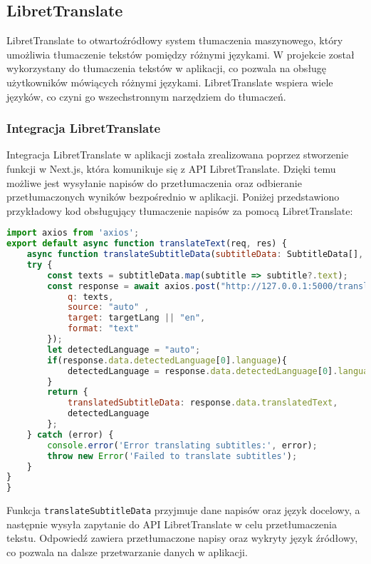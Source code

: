 \subsection{LibretTranslate}
LibretTranslate to otwartoźródłowy system tłumaczenia maszynowego, który umożliwia tłumaczenie tekstów pomiędzy różnymi językami. W projekcie został wykorzystany do tłumaczenia tekstów w aplikacji, co pozwala na obsługę użytkowników mówiących różnymi językami. LibretTranslate wspiera wiele języków, co czyni go wszechstronnym narzędziem do tłumaczeń.

\subsubsection{Integracja LibretTranslate}
Integracja LibretTranslate w aplikacji została zrealizowana poprzez stworzenie funkcji w Next.js, która komunikuje się z API LibretTranslate. Dzięki temu możliwe jest wysyłanie napisów do przetłumaczenia oraz odbieranie przetłumaczonych wyników bezpośrednio w aplikacji. Poniżej przedstawiono przykładowy kod obsługujący tłumaczenie napisów za pomocą LibretTranslate:

\begin{lstlisting}[language=JavaScript, caption=Przykładowy kod integracji LibretTranslate w Next.js]
import axios from 'axios';
export default async function translateText(req, res) {
    async function translateSubtitleData(subtitleData: SubtitleData[], targetLang: string) {
    try {
        const texts = subtitleData.map(subtitle => subtitle?.text);
        const response = await axios.post("http://127.0.0.1:5000/translate", {
            q: texts,
            source: "auto" ,
            target: targetLang || "en",
            format: "text"
        });
        let detectedLanguage = "auto";
        if(response.data.detectedLanguage[0].language){
            detectedLanguage = response.data.detectedLanguage[0].language;
        }
        return {
            translatedSubtitleData: response.data.translatedText,
            detectedLanguage
        };
    } catch (error) {
        console.error('Error translating subtitles:', error);
        throw new Error('Failed to translate subtitles');
    }
}
}
\end{lstlisting}

Funkcja \texttt{translateSubtitleData} przyjmuje dane napisów oraz język docelowy, a następnie wysyła zapytanie do API LibretTranslate w celu przetłumaczenia tekstu. Odpowiedź zawiera przetłumaczone napisy oraz wykryty język źródłowy, co pozwala na dalsze przetwarzanie danych w aplikacji.

